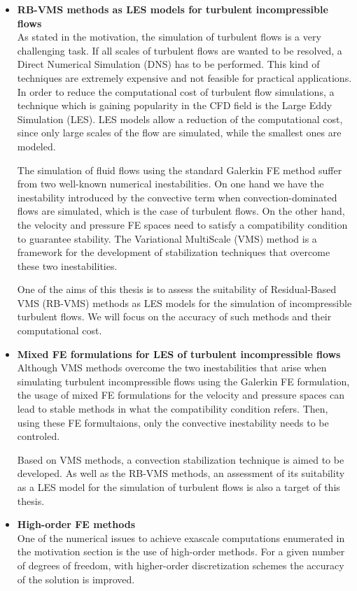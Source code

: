 \begin{itemize}
\item {\bf RB-VMS methods as LES models for turbulent incompressible flows}\\
As stated in the motivation, the simulation of turbulent flows is a very challenging task. If all scales of turbulent flows are wanted to be resolved, a Direct Numerical Simulation (DNS) has to be performed. This kind of techniques are extremely expensive and not feasible for practical applications. In order to reduce the computational cost of turbulent flow simulations, a technique which is gaining popularity in the CFD field is the Large Eddy Simulation (LES). LES models allow a reduction of the computational cost, since only large scales of the flow are simulated, while the smallest ones are modeled.

The simulation of fluid flows using the standard Galerkin FE method suffer from two well-known numerical inestabilities. On one hand we have the inestability introduced by the convective term when convection-dominated flows are simulated, which is the case of turbulent flows. On the other hand, the velocity and pressure FE spaces need to satisfy a compatibility condition to guarantee stability. The Variational MultiScale (VMS) method is a framework for the development of stabilization techniques that overcome these two inestabilities. 

One of the aims of this thesis is to assess the suitability of Residual-Based VMS (RB-VMS) methods as LES models for the simulation of incompressible turbulent flows. We will focus on the accuracy of such methods and their computational cost.

\item {\bf Mixed FE formulations for LES of turbulent incompressible flows}\\
Although VMS methods overcome the two inestabilities that arise when simulating turbulent incompressible flows using the Galerkin FE formulation, the usage of mixed FE formulations for the velocity and pressure spaces can lead to stable methods in what the compatibility condition refers. Then, using these FE formultaions, only the convective inestability needs to be controled.

Based on VMS methods, a convection stabilization technique is aimed to be developed. As well as the RB-VMS methods, an assessment of its suitability as a LES model for the simulation of turbulent flows is also a target of this thesis.

\item {\bf High-order FE methods}\\
One of the numerical issues to achieve exascale computations enumerated in the motivation section is the use of high-order methods. For a given number of degrees of freedom, with higher-order discretization schemes the accuracy of the solution is improved. 


\end{itemize}
